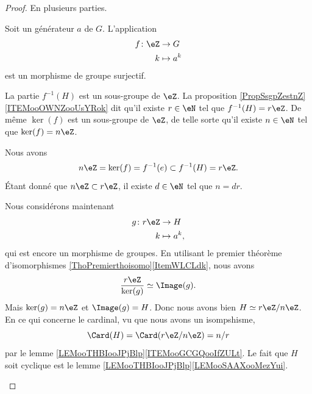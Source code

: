 \begin{proof}
	En plusieurs parties.
	\begin{subproof}
		Soit un générateur \( a\) de \( G\). L'application
		\begin{equation}
			\begin{aligned}
				f\colon \eZ & \to G       \\
				k           & \mapsto a^k
			\end{aligned}
		\end{equation}
		est un morphisme de groupe surjectif.

		La partie \( f^{-1}(H)\) est un sous-groupe de \( \eZ\). La proposition \ref{PropSsgpZestnZ}\ref{ITEMooOWNZooUsYRok} dit qu'il existe \( r\in \eN\) tel que \( f^{-1}(H)=r\eZ\). De même \( \ker(f)\) est un sous-groupe de \( \eZ\), de telle sorte qu'il existe \( n\in \eN\) tel que \( \ker(f)=n\eZ\).

		Nous avons
		\begin{equation}
			n\eZ=\ker(f)=f^{-1}(e)\subset f^{-1}(H)=r\eZ.
		\end{equation}
		Étant donné que \( n\eZ\subset r\eZ\), il existe \( d\in \eN\) tel que \( n=dr\).

		Nous considérons maintenant
		\begin{equation}
			\begin{aligned}
				g\colon r\eZ & \to H        \\
				k            & \mapsto a^k,
			\end{aligned}
		\end{equation}
		qui est encore un morphisme de groupes. En utilisant le premier théorème d'isomorphismes \ref{ThoPremierthoisomo}\ref{ItemWLCLdk}, nous avons
		\begin{equation}
			\frac{ r\eZ }{ \ker(g) }\simeq\Image(g).
		\end{equation}
		Mais \( \ker(g)=n\eZ\) et \( \Image(g)=H\). Donc nous avons bien \( H\simeq r\eZ/n\eZ\).
		En ce qui concerne le cardinal, vu que nous avons un isompshisme,
		\begin{equation}
			\Card(H)=\Card(r\eZ/n\eZ)=n/r
		\end{equation}
		par le lemme \ref{LEMooTHBIooJPjBlp}\ref{ITEMooGCGQooIfZULt}.
		Le fait que \( H\) soit cyclique est le lemme \ref{LEMooTHBIooJPjBlp}\ref{LEMooSAAXooMezYui}.
	\end{subproof}
\end{proof}

